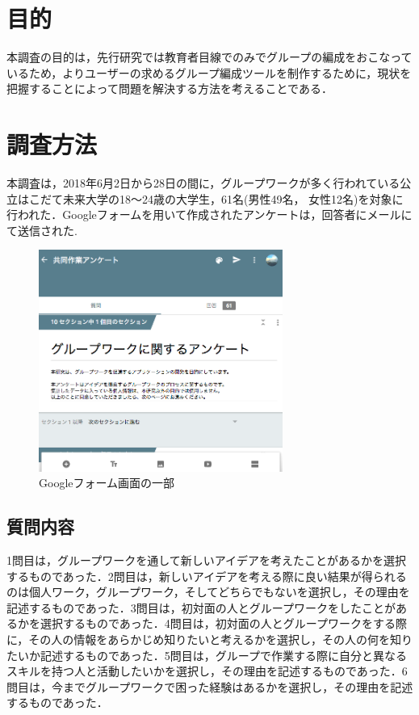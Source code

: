 \documentclass{funthesis}
\begin{document}
\section{目的}

本調査の目的は，先行研究では教育者目線でのみでグループの編成をおこなっているため，よりユーザーの求めるグループ編成ツールを制作するために，現状を把握することによって問題を解決する方法を考えることである．

\section{調査方法}

本調査は，2018年6月2日から28日の間に，グループワークが多く行われている公立はこだて未来大学の18〜24歳の大学生，61名(男性49名， 女性12名)を対象に行われた．Googleフォームを用いて作成されたアンケートは，回答者にメールにて送信された.
\begin{figure}[H]
 \centering
   \includegraphics[width=80mm]{figures/groupwork1.png}
 \caption{Googleフォーム画面の一部}
 \label{fig:model}
\end{figure}


\subsection{質問内容}

1問目は，グループワークを通して新しいアイデアを考えたことがあるかを選択するものであった．2問目は，新しいアイデアを考える際に良い結果が得られるのは個人ワーク，グループワーク，そしてどちらでもないを選択し，その理由を記述するものであった．3問目は，初対面の人とグループワークをしたことがあるかを選択するものであった．4問目は，初対面の人とグループワークをする際に，その人の情報をあらかじめ知りたいと考えるかを選択し，その人の何を知りたいか記述するものであった．5問目は，グループで作業する際に自分と異なるスキルを持つ人と活動したいかを選択し，その理由を記述するものであった．6問目は，今までグループワークで困った経験はあるかを選択し，その理由を記述するものであった．
\end{document}
